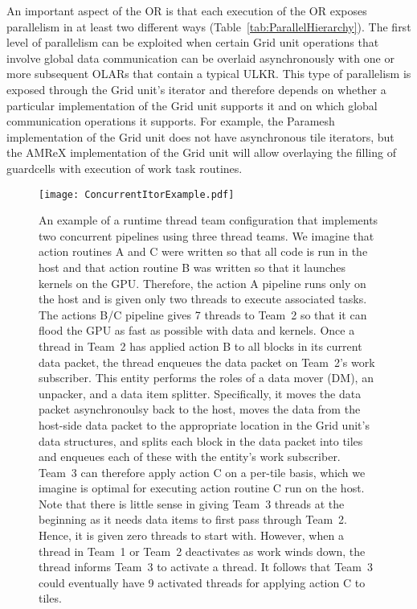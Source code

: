 \documentclass{article}
\newcommand{\shortULKR}  {ULKR\xspace}
\newcommand{\shortOLARs} {OLARs\xspace}
\newcommand{\shortOR}   {OR\xspace}
\newcommand{\ULKR}   {\shortULKR}
\newcommand{\OLARs}  {\shortOLARs}             %
\newcommand{\OR}        {\shortOR}
\newcommand{\taskroutines}       {task routines\xspace}
\begin{document}
An important aspect of the \OR is that each execution of the \OR exposes
parallelism in at least two different ways (Table~\ref{tab:ParallelHierarchy}).
The first level of parallelism can be exploited when certain Grid unit
operations that involve global data communication can be overlaid asynchronously
with one or more subsequent \OLARs that contain a typical \ULKR.  This type of
parallelism is exposed through the Grid unit's iterator and therefore depends on
whether a particular implementation of the Grid unit supports it and on which
global communication operations it supports.  For example, the Paramesh
implementation of the Grid unit does not have asynchronous tile iterators, but
the AMReX implementation of the Grid unit will allow overlaying the filling of
guardcells with execution of work \taskroutines.\\


\begin{figure}[!ht]
\begin{center}
\texttt{[image: ConcurrentItorExample.pdf]} \caption[]{An example
of a runtime thread team configuration that implements two concurrent pipelines
using three thread teams.  We imagine that action routines A and C were written
so that all code is run in the host and that action routine B was written so
that it launches kernels on the GPU.  Therefore, the action A pipeline
runs only on the host and is given only two threads to execute associated tasks.  The
actions B/C pipeline gives 7 threads to Team~2 so that it can flood the
GPU as fast as possible with data and kernels.  Once a thread in Team~2 has
applied action B to all blocks in its current data packet, the thread
enqueues the data packet on Team~2's work subscriber.  This entity performs the
roles of a data mover (DM), an unpacker, and a data item splitter.  Specifically,
it moves the data packet asynchronoulsy back to the host, moves the data from
the host-side data packet to the appropriate location in the Grid unit's data
structures, and splits each block in the data packet into tiles and enqueues
each of these with the entity's work subscriber.  Team~3 can therefore apply
action C on a per-tile basis, which we imagine is optimal for executing action
routine C run on the host.  Note that there is little sense in giving Team~3
threads at the beginning as it needs data items to first pass through Team~2.
Hence, it is given zero threads to start with.  However, when a thread in Team~1
or Team~2 deactivates as work winds down, the thread informs Team~3 to activate
a thread.  It follows that Team~3 could eventually have 9 activated threads for
applying action C to tiles.}
\label{fig:ConcurrentItor}
\end{center}
\end{figure}
\end{document}
